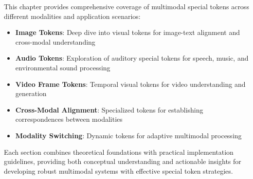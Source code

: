 This chapter provides comprehensive coverage of multimodal special tokens across different modalities and application scenarios:

\begin{itemize}
\item \textbf{Image Tokens}: Deep dive into visual tokens for image-text alignment and cross-modal understanding
\item \textbf{Audio Tokens}: Exploration of auditory special tokens for speech, music, and environmental sound processing
\item \textbf{Video Frame Tokens}: Temporal visual tokens for video understanding and generation
\item \textbf{Cross-Modal Alignment}: Specialized tokens for establishing correspondences between modalities
\item \textbf{Modality Switching}: Dynamic tokens for adaptive multimodal processing
\end{itemize}

Each section combines theoretical foundations with practical implementation guidelines, providing both conceptual understanding and actionable insights for developing robust multimodal systems with effective special token strategies.